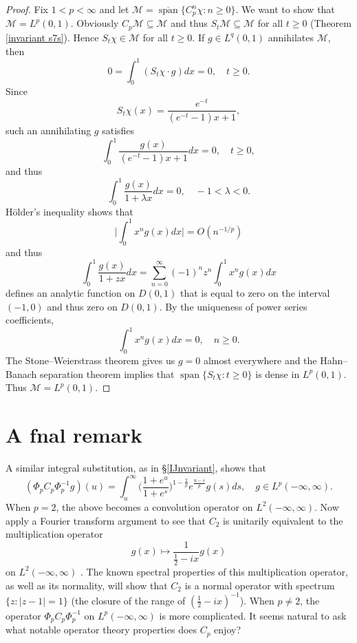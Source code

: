 \documentclass[11pt]{amsart}
\numberwithin{equation}{section}
\theoremstyle{plain}
\theoremstyle{definition}
\renewcommand{\geq}{\geqslant}
\renewcommand{\subset}{\subseteq}
\newcommand{\0}{{\color{lightgray}0}}
\begin{document}
\begin{proof}
Fix $1 < p < \infty$ and let 
$\mathcal{M} = \overline{\operatorname{span}}\{C_{p}^{n} \chi: n \geq 0\} .$ We want to show that $\mathcal{M} = L^p(0, 1)$. Obviously $C_{p} \mathcal{M} \subset \mathcal{M}$ and thus 
$S_{t} \mathcal{M} \subset \mathcal{M}$ for all $t \geq 0$ (Theorem \ref{invariant s7s}). Hence $S_{t} \chi \in \mathcal{M}$ for all $t \geq 0$. If $g \in L^q(0, 1)$ annihilates $\mathcal{M}$, then 
$$0 = \int_{0}^{1} (S_{t} \chi \cdot g) dx = 0, \quad t \geq 0.$$
Since 
$$S_{t} \chi(x) = \frac{e^{-t}}{(e^{-t} - 1) x + 1},$$
such an annihilating $g$ satisfies 
$$\int_{0}^{1}  \frac{g(x)}{(e^{-t} - 1) x + 1} dx = 0, \quad t \geq 0,$$ and thus 
$$\int_{0}^{1} \frac{g(x)}{1 + \lambda x} dx = 0, \quad -1 < \lambda < 0.$$
H\"{o}lder's inequality shows that 
$$\Big|\int_{0}^{1} x^n g(x) dx\Big| = O(n^{-1/p})$$
and thus
$$\int_{0}^{1} \frac{g(x)}{1 + z x} dx = \sum_{n = 0}^{\infty} (-1)^n z^n \int_{0}^{1} x^n g(x) dx$$ defines an analytic function on $D(0, 1)$ that is equal to zero on the interval $(-1, 0)$ and thus zero on $D(0, 1)$. By the uniqueness of power series coefficients, 
$$\int_{0}^{1} x^n g(x) dx = 0, \quad n \geq 0.$$ The Stone--Weierstrass theorem gives us  $g = 0$ almost everywhere and the Hahn--Banach separation theorem implies that $\operatorname{span}\{S_t \chi: t \geq 0\}$ is dense in $L^p(0, 1)$. Thus $\mathcal{M} = L^p(0, 1)$. 
\end{proof}


\section{A fnal remark}

A similar integral substitution, as in \S \ref{IJnvariant}, shows that 
$$(\Phi_p C_p \Phi_{p}^{-1} g)(u) = \int_{u}^{\infty} \Big(\frac{1 + e^u}{1 + e^s}\Big)^{1 - \frac{2}{p}} e^{\frac{u - s}{p}} g(s) ds, \quad g \in L^{p}(-\infty, \infty).$$
When $p = 2$, the above becomes a convolution operator on $L^2(-\infty, \infty)$. Now apply a Fourier transform argument to see that $C_2$ is unitarily equivalent to the multiplication operator 
$$g(x) \mapsto \frac{1}{\frac{1}{2} - i x} g(x)$$
on $L^2(-\infty, \infty)$ \cite{CL2}.
The known spectral properties of this multiplication operator, as well as its normality, will show that  $C_2$ is a normal operator with spectrum $\{z: |z - 1| = 1\}$ (the closure of the range of $(\frac{1}{2} - i x)^{-1}$). When $p \not = 2$,  the operator $\Phi_{p}C_{p} \Phi_{p}^{-1}$ on $L^p(-\infty, \infty)$ is more complicated. It seems natural to ask what  notable operator theory properties does $C_p$ enjoy?






\end{document}
